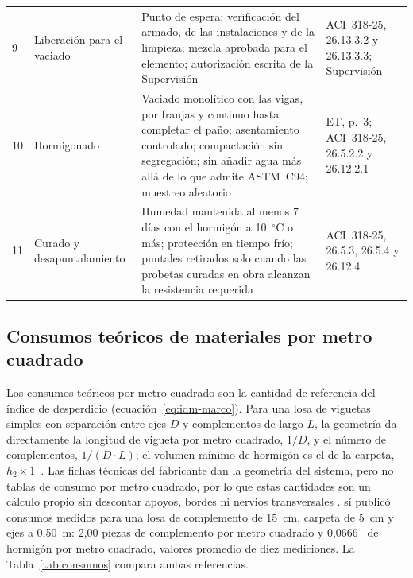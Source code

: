 \begin{longtable}{@{}P{0.55cm}P{2.65cm}P{8.8cm}P{3.65cm}@{}}
9 & Liberación para el vaciado & Punto de espera: verificación del armado, de las instalaciones y de la limpieza; mezcla aprobada para el elemento; autorización escrita de la Supervisión & ACI~318-25, 26.13.3.2 y 26.13.3.3; Supervisión \\
10 & Hormigonado & Vaciado monolítico con las vigas, por franjas y continuo hasta completar el paño; asentamiento controlado; compactación sin segregación; sin añadir agua más allá de lo que admite ASTM~C94; muestreo aleatorio & ET, p.~3; ACI~318-25, 26.5.2.2 y 26.12.2.1 \\
11 & Curado y desapuntalamiento & Humedad mantenida al menos 7 días con el hormigón a 10~$^{\circ}$C o más; protección en tiempo frío; puntales retirados solo cuando las probetas curadas en obra alcanzan la resistencia requerida & ACI~318-25, 26.5.3, 26.5.4 y 26.12.4 \\
\end{longtable}
\vspace{-6pt}
\endgroup

\subsection{Consumos teóricos de materiales por metro cuadrado}

Los consumos teóricos por metro cuadrado son la cantidad de referencia del índice de desperdicio (ecuación~\ref{eq:idm-marco}). Para una losa de viguetas simples con separación entre ejes $D$ y complementos de largo $L$, la geometría da directamente la longitud de vigueta por metro cuadrado, $1/D$, y el número de complementos, $1/(D \cdot L)$; el volumen mínimo de hormigón es el de la carpeta, $h_2 \times 1$~\mdos{}. Las fichas técnicas del fabricante dan la geometría del sistema, pero no tablas de consumo por metro cuadrado, por lo que estas cantidades son un cálculo propio sin descontar apoyos, bordes ni nervios transversales \parencite[hoja~3]{concretec2018viguetas}. \textcite[p.~103]{alcon2009} sí publicó consumos medidos para una losa de complemento de 15~cm, carpeta de 5~cm y ejes a 0,50~m: 2,00 piezas de complemento por metro cuadrado y 0,0666~\mtres{} de hormigón por metro cuadrado, valores promedio de diez mediciones. La Tabla~\ref{tab:consumos} compara ambas referencias.

